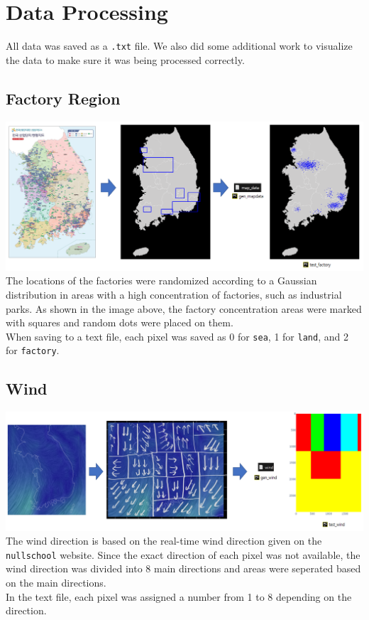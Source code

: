 \section{Data Processing}
    All data was saved as a \texttt{.txt} file. We also did some additional work to visualize the data to make sure it was being processed correctly.
    \subsection{Factory Region}
        \includegraphics[scale = 0.7]{factoryregion.png}\\
        The locations of the factories were randomized according to a Gaussian distribution in areas with a high concentration of factories, such as industrial parks. As shown in the image above, the factory concentration areas were marked with squares and random dots were placed on them.\\
        When saving to a text file, each pixel was saved as 0 for \texttt{sea}, 1 for \texttt{land}, and 2 for \texttt{factory}.
    \subsection{Wind}
        \includegraphics[scale = 0.7]{wind.png}\\
        The wind direction is based on the real-time wind direction given on the \texttt{nullschool} website. Since the exact direction of each pixel was not available, the wind direction was divided into 8 main directions and areas were seperated based on the main directions.\\
        In the text file, each pixel was assigned a number from 1 to 8 depending on the direction.

